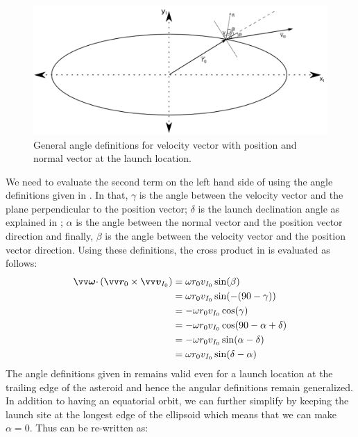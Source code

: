 \begin{figure}[htb]
\centering
\captionsetup{justification=centering}
\includegraphics[width=\textwidth, height=0.3\textheight, keepaspectratio=true]{non_conservative_escape_velocity_angles.pdf}
\caption{General angle definitions for velocity vector with position and normal vector at the launch location.}
\label{fig:velocity_vector_angles}
\end{figure}
\FloatBarrier
We need to evaluate the second term on the left hand side of  using the angle definitions given in . In that, $\gamma$ is the angle between the velocity vector and the plane perpendicular to the position vector; $\delta$ is the launch declination angle as explained in ; $\alpha$ is the angle between the normal vector and the position vector direction and finally, $\beta$ is the angle between the velocity vector and the position vector direction. Using these definitions, the cross product in  is evaluated as follows:
\begin{align}
    \bv{\omega} \cdotp (\bv{r}_0 \times \bv{v}_{I_0}) &= \omega r_0 v_{I_0} \sin(\beta) \\
    &= \omega r_0 v_{I_0} \sin(-(90 - \gamma)) \\
    &= -\omega r_0 v_{I_0} \cos(\gamma) \\
    &= -\omega r_0 v_{I_0} \cos(90 - \alpha + \delta) \\
    &= -\omega r_0 v_{I_0} \sin(\alpha - \delta) \\
    &= \omega r_0 v_{I_0} \sin(\delta - \alpha)
    \label{eqn:cross_product_eval}
\end{align}
The angle definitions given in  remains valid even for a launch location at the trailing edge of the asteroid and hence the angular definitions remain generalized. In addition to having an equatorial orbit, we can further simplify  by keeping the launch site at the longest edge of the ellipsoid which means that we can make $\alpha=0$. Thus  can be re-written as:
